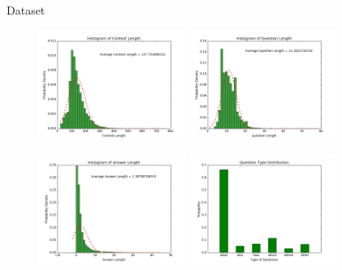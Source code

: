 \documentclass{article}
\begin{document}
\begin{psection}{Dataset}
	\begin{figure}[H]
			\centering
			\begin{minipage}{0.47\textwidth}
				\centering
				\includegraphics[height=135px]{includes/context_hist_fin.png}
				\caption{}
			\end{minipage}
			\begin{minipage}{0.47\textwidth}
				\centering
				\includegraphics[height=135px]{includes/question_hist_fin.png}
				\caption{}
			\end{minipage}
	\end{figure}
	\begin{figure}[H]
	\centering
			\begin{minipage}{0.47\textwidth}
				\centering
				\includegraphics[height=135px]{includes/ans_hist_fin.png}
				\caption{}
			\end{minipage}
			\begin{minipage}{0.47\textwidth}
				\centering
				\includegraphics[height=135px]{includes/dist2.png}
				\caption{}
			\end{minipage}
		\end{figure}


\end{psection}
\end{document}
